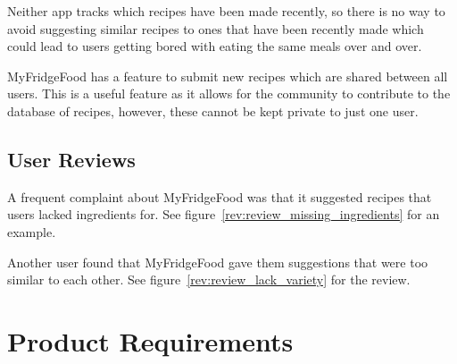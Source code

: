 Neither app tracks which recipes have been made recently, so there is no way to avoid suggesting similar recipes to ones that have been recently made which could lead to
users getting bored with eating the same meals over and over.

MyFridgeFood has a feature to submit new recipes which are shared between all users. This is a useful feature as it allows for the community to contribute to the database
of recipes, however, these cannot be kept private to just one user.

\subsection{User Reviews}

A frequent complaint about MyFridgeFood was that it suggested
recipes that users lacked ingredients for. See figure~\ref{rev:review_missing_ingredients} for an example.

Another user found that MyFridgeFood gave them suggestions that were too similar to each
other. See figure~\ref{rev:review_lack_variety} for the review.

\section{Product Requirements}

\newcommand{\requirementtype}{FR}
\newcommand{\requirement}[4]{
    \requirementtype\stepcounter{functionalreqcounter}\arabic{functionalreqcounter}
        &
    \raggedright#1
        &
    #2
        &
    #3
        &
    #4
        \\
}

